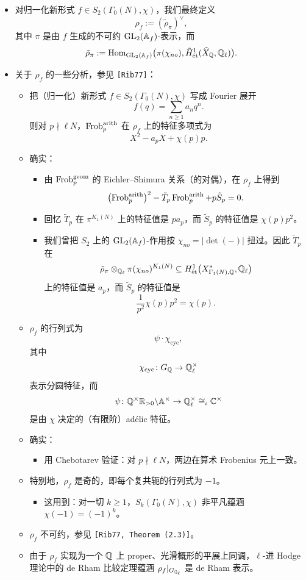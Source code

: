 \begin{itemize}
\item 对归一化新形式 $f\in S_2(\Gamma_0(N),\chi)$，我们最终定义
\[
\rho_f:=(\tilde\rho_\pi)^\vee,
\]
其中 $\pi$ 是由 $f$ 生成的不可约 $\operatorname{GL}_2(\mathbb{A}_f)$-表示，而
\[
\tilde\rho_\pi:=\operatorname{Hom}_{\operatorname{GL}_2(\mathbb{A}_f)}\bigl(\pi(\chi_{no}),\tilde H^1_{\mathrm{\acute{e}t}}(\widehat X_{\mathbb{Q}},\mathbb{Q}_\ell)\bigr).
\]
\item 关于 $\rho_f$ 的一些分析，参见 \texttt{[Rib77]}：
\begin{itemize}
\item 把（归一化）新形式 $f\in S_2(\Gamma_0(N),\chi)$ 写成 Fourier 展开
\[
f(q)=\sum_{n\ge1}a_nq^n .
\]
则对 $p\nmid\ell N$，$\operatorname{Frob}_p^{\mathrm{arith}}$ 在 $\rho_f$ 上的特征多项式为
\[
X^2-a_pX+\chi(p)p .
\]
\item 确实：
\begin{itemize}
\item 由 $\operatorname{Frob}_p^{\mathrm{geom}}$ 的 Eichler--Shimura 关系（的对偶），在 $\rho_f$ 上得到
\[
\bigl(\operatorname{Frob}_p^{\mathrm{arith}}\bigr)^2-\tilde T_p\operatorname{Frob}_p^{\mathrm{arith}}+p\tilde S_p=0 .
\]
\item 回忆 $\tilde T_p$ 在 $\pi^{K_1(N)}$ 上的特征值是 $pa_p$，而 $\tilde S_p$ 的特征值是 $\chi(p)p^2$。
\item 我们曾把 $S_2$ 上的 $\operatorname{GL}_2(\mathbb{A}_f)$-作用按 $\chi_{no}=|\det(-)|$ 扭过。因此 $\tilde T_p$ 在
\[
\tilde\rho_\pi\otimes_{\mathbb{Q}_\ell}\pi(\chi_{no})^{K_1(N)}\subseteq H^1_{\mathrm{\acute{e}t}}\bigl(X^*_{\Gamma_1(N),\mathbb{Q}},\mathbb{Q}_\ell\bigr)
\]
上的特征值是 $a_p$，而 $\tilde S_p$ 的特征值是
\[
\frac{1}{p^2}\chi(p)p^2=\chi(p).
\]
\end{itemize}
\item $\rho_f$ 的行列式为
\[
\psi\cdot\chi_{\mathrm{cyc}},
\]
其中
\[
\chi_{\mathrm{cyc}}\colon G_{\mathbb{Q}}\to\mathbb{Q}_\ell^\times
\]
表示分圆特征，而
\[
\psi\colon\mathbb{Q}^\times\mathbb{R}_{>0}\backslash\mathbb{A}^\times\to\mathbb{Q}_\ell^\times\cong_{\iota}\mathbb{C}^\times
\]
是由 $\chi$ 决定的（有限阶）adélic 特征。
\item 确实：
\begin{itemize}
\item 用 Chebotarev 验证：对 $p\nmid\ell N$，两边在算术 Frobenius 元上一致。
\end{itemize}
\item 特别地，$\rho_f$ 是奇的，即每个复共轭的行列式为 $-1$。
\begin{itemize}
\item 这用到：对一切 $k\ge1$，$S_k(\Gamma_0(N),\chi)$ 非平凡蕴涵 $\chi(-1)=(-1)^k$。
\end{itemize}
\item $\rho_f$ 不可约，参见 \texttt{[Rib77, Theorem (2.3)]}。
\item 由于 $\rho_f$ 实现为一个 $\mathbb{Q}$ 上 proper、光滑概形的平展上同调，$\ell$-进 Hodge 理论中的 de Rham 比较定理蕴涵 $\rho_f|_{G_{\mathbb{Q}_\ell}}$ 是 de Rham 表示。
\end{itemize}
\end{itemize}

